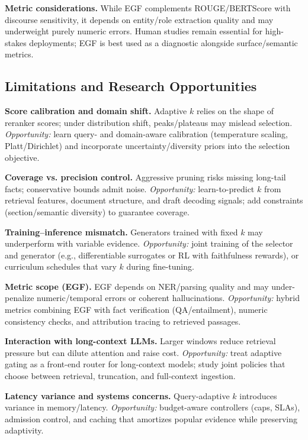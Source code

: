 \documentclass[11pt,a4paper]{article}
\begin{document}
\textbf{Metric considerations.} While EGF complements ROUGE/BERTScore with discourse sensitivity, it depends on entity/role extraction quality and may underweight purely numeric errors. Human studies remain essential for high-stakes deployments; EGF is best used as a diagnostic alongside surface/semantic metrics.
\subsection{Limitations and Research Opportunities}

\textbf{Score calibration and domain shift.} Adaptive $k$ relies on the shape of reranker scores; under distribution shift, peaks/plateaus may mislead selection. \emph{Opportunity:} learn query- and domain-aware calibration (temperature scaling, Platt/Dirichlet) and incorporate uncertainty/diversity priors into the selection objective.

\textbf{Coverage vs. precision control.} Aggressive pruning risks missing long-tail facts; conservative bounds admit noise. \emph{Opportunity:} learn-to-predict $k$ from retrieval features, document structure, and draft decoding signals; add constraints (section/semantic diversity) to guarantee coverage.

\textbf{Training--inference mismatch.} Generators trained with fixed $k$ may underperform with variable evidence. \emph{Opportunity:} joint training of the selector and generator (e.g., differentiable surrogates or RL with faithfulness rewards), or curriculum schedules that vary $k$ during fine-tuning.

\textbf{Metric scope (EGF).} EGF depends on NER/parsing quality and may under-penalize numeric/temporal errors or coherent hallucinations. \emph{Opportunity:} hybrid metrics combining EGF with fact verification (QA/entailment), numeric consistency checks, and attribution tracing to retrieved passages.

\textbf{Interaction with long-context LLMs.} Larger windows reduce retrieval pressure but can dilute attention and raise cost. \emph{Opportunity:} treat adaptive gating as a front-end router for long-context models; study joint policies that choose between retrieval, truncation, and full-context ingestion.

\textbf{Latency variance and systems concerns.} Query-adaptive $k$ introduces variance in memory/latency. \emph{Opportunity:} budget-aware controllers (caps, SLAs), admission control, and caching that amortizes popular evidence while preserving adaptivity.
\end{document}
